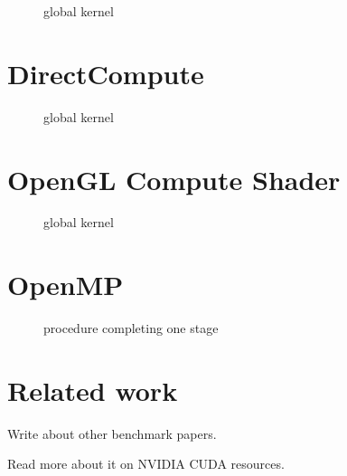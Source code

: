 \begin{figure}
	\centering
	\fbox{}
	\caption{{\OCL} global kernel}
	\label{lst:sample:global:ocl}	
\end{figure}

\section{DirectCompute}

\begin{figure}
	\centering
	\fbox{}
	\caption{{\DX} global kernel}
	\label{lst:sample:global:dx}	
\end{figure}

\section{OpenGL Compute Shader}

\begin{figure}
	\centering
	\fbox{}
	\caption{{\GL} global kernel}
	\label{lst:sample:global:gl}	
\end{figure}

\section{OpenMP}%
%
\begin{figure}%
	\centering%
	\fbox{}%
	\caption{{\OMP} procedure completing one stage}%
	\label{lst:sample:global:omp}%
\end{figure}%

\section{Related work}

Write about other benchmark papers.

Read more about it on NVIDIA CUDA resources.